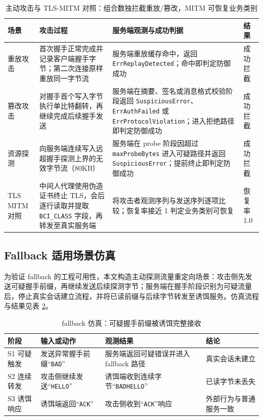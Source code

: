 \begin{table}[H]
\centering
\small
\caption{主动攻击与 TLS-MITM 对照：组合数独拦截重放/篡改，MITM 可恢复业务类别}
\label{tab:c4-security-evidence}
\begin{tabular}{>{\raggedright\arraybackslash}p{1.8cm}>{\raggedright\arraybackslash}p{3.5cm}>{\raggedright\arraybackslash}p{5.0cm}>{\raggedright\arraybackslash}p{1.8cm}}
\toprule
场景 & 攻击过程 & 服务端观测与成功判据 & 结果 \\
\midrule
重放攻击 & 首次握手正常完成并记录客户端握手字节；第二次连接原样重放同一字节流 & 服务端重放缓存命中，返回 \texttt{ErrReplayDetected}；命中即判定防御成功 & 成功拦截 \\
篡改攻击 & 对握手首个写入字节执行单比特翻转，再继续完成后续握手发送 & 服务端在摘要、签名或消息格式校验阶段返回 \texttt{SuspiciousError}、\texttt{ErrAuthFailed} 或 \texttt{ErrProtocolViolation}；进入拒绝路径即判定防御成功 & 成功拦截 \\
资源探测 & 向服务端连续写入远超握手探测上界的无效字节流（80KB） & 服务端在 probe 阶段因超过 \texttt{maxProbeBytes} 进入可疑路径并返回 \texttt{SuspiciousError}；提前终止即判定防御成功 & 成功拦截 \\
TLS MITM 对照 & 中间人代理使用伪造证书终止 TLS，会后逐行读取并提取 \texttt{BCI\_CLASS} 字段，再转发至真实服务端 & 将攻击者观测序列与发送序列逐项比较；恢复率接近 1 判定业务类别可恢复 & 恢复率 1.0 \\
\bottomrule
\end{tabular}
\end{table}

\subsection{Fallback 适用场景仿真}
为验证 fallback 的工程可用性，本文构造主动探测流量重定向场景：攻击侧先发送可疑握手前缀，再继续发送后续探测字节；服务端在握手阶段识别为可疑流量后，停止真实会话建立流程，并将已读前缀与后续字节转发至诱饵服务。仿真流程与结果见表 \ref{tab:c4-fallback-sim}。

\begin{table}[H]
\centering
\small
\caption{fallback 仿真：可疑握手前缀被诱饵完整接收}
\label{tab:c4-fallback-sim}
\begin{tabular}{p{2.0cm}p{4.1cm}p{4.0cm}p{2.8cm}}
\toprule
阶段 & 输入或动作 & 观测结果 & 结论 \\
\midrule
S1 可疑触发 & 发送异常握手前缀“\texttt{BAD}” & 服务端返回可疑错误并进入 fallback 路径 & 真实会话未建立 \\
\midrule
S2 连续转发 & 攻击侧继续发送“\texttt{HELLO}” & 诱饵端收到连续字节“\texttt{BADHELLO}” & 已读字节未丢失 \\
\midrule
S3 诱饵响应 & 诱饵端返回“\texttt{ACK}” & 攻击侧收到“\texttt{ACK}”响应 & 外部行为与普通服务一致 \\
\bottomrule
\end{tabular}
\end{table}

